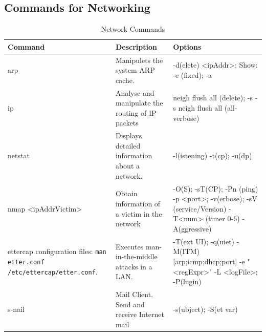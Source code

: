 \subsection{Commands for Networking}
\begin{table}[H]
	\centering
    \begin{tabular}{|p{6cm}|p{3cm}|p{6cm}|}\hline
        \rowcolor{gray!30}
		\textbf{Command} & \textbf{Description} & \textbf{Options} \\ \hline
		
        arp 
            & Manipulets the system ARP cache.
            & -d(elete) <ipAddr>; 
                \newline Show: -e (fixed); -a 
        \\ \hline

        ip 
            & Analyse and manipulate the routing of IP packets
            & neigh flush all (delete);
                \newline -s -s neigh flush all (all-verbose)
        \\ \hline

        netstat
            & Displays detailed information about a network.
            & -l(istening) \newline -t(cp); -u(dp)
        \\ \hline

        nmap <ipAddrVictim>
            & Obtain information of a victim in the network
            & -O(S); -sT(CP); -Pn (ping)
                \newline -p <port>; 
                \newline -v(erbose); -sV (service/Version)
                \newline -T<num> (timer 0-6)
                \newline -A(ggressive)
        \\ \hline

        ettercap \newline \newline configuration files: \newline \texttt{man etter.conf} \newline \texttt{/etc/ettercap/etter.conf}.
            & Executes man-in-the-middle attacks in a LAN.
            & -T(ext UI); -q(uiet)
            \newline -M(ITM) [arp;icmp;dhcp;port]
            \newline -e "<regExpr>"
            \newline -L <logFile>; -P(lugin)
        \\ \hline

        s-nail 
            & Mail Client. Send and receive Internet mail
            & -s(ubject); -S(et var)
        \\ \hline


    \end{tabular}

    \caption{Network Commands}

    \label{tab:basicNetworkCommands}
\end{table}
\clearpage

